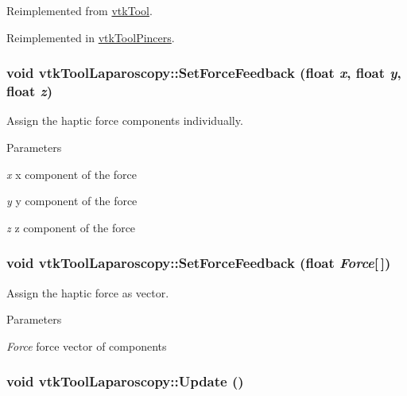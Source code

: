 Reimplemented from \hyperlink{classvtkTool_a80c0ca1937ce97c98d70364cac281ff2}{vtkTool}.



Reimplemented in \hyperlink{classvtkToolPincers_ad7a4a9f0e3291b88eb4e30986784539a}{vtkToolPincers}.

\hypertarget{classvtkToolLaparoscopy_aa716d470104640646068eaa160a7adf2}{
\subsubsection[{SetForceFeedback}]{\setlength{\rightskip}{0pt plus 5cm}void vtkToolLaparoscopy::SetForceFeedback (float {\em x}, \/  float {\em y}, \/  float {\em z})}}
\label{classvtkToolLaparoscopy_aa716d470104640646068eaa160a7adf2}


Assign the haptic force components individually. 


\begin{DoxyParams}{Parameters}
\item[{\em x}]x component of the force \item[{\em y}]y component of the force \item[{\em z}]z component of the force \end{DoxyParams}
\hypertarget{classvtkToolLaparoscopy_a9bbfa040ca224472e6c669a3c27d9977}{
\subsubsection[{SetForceFeedback}]{\setlength{\rightskip}{0pt plus 5cm}void vtkToolLaparoscopy::SetForceFeedback (float {\em Force}\mbox{[}$\,$\mbox{]})}}
\label{classvtkToolLaparoscopy_a9bbfa040ca224472e6c669a3c27d9977}


Assign the haptic force as vector. 


\begin{DoxyParams}{Parameters}
\item[{\em Force}]force vector of components \end{DoxyParams}
\hypertarget{classvtkToolLaparoscopy_a4445a0cfabd77b50a06929b04cb71f9e}{
\subsubsection[{Update}]{\setlength{\rightskip}{0pt plus 5cm}void vtkToolLaparoscopy::Update ()}}
\label{classvtkToolLaparoscopy_a4445a0cfabd77b50a06929b04cb71f9e}


